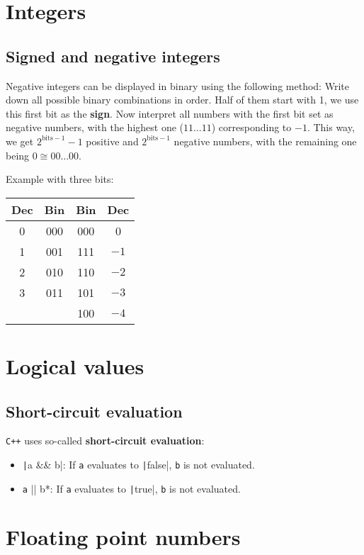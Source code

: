 \documentclass[fontsize=9pt, paper=landscape]{scrartcl}
\begin{document}
\begin{multicols}{2}
\section{Integers}

\subsection{Signed and negative integers}

Negative integers can be displayed in binary using the following method: Write down all possible binary combinations in order. Half of them start with 1, we use this first bit as the \textbf{sign}. Now interpret all numbers with the first bit set as negative numbers, with the highest one ($11\dots11$) corresponding to $-1$. This way, we get $2^{\text{bits}-1}-1$ positive and $2^{\text{bits}-1}$ negative numbers, with the remaining one being $0 \cong 00\dots00$.

Example with three bits:
\begin{tabular}{|c|c||c|c|}
	\hline
	Dec & Bin & Bin & Dec \\
	\hline
	0 & 000 & 000 & 0 \\
	1 & 001 & 111 & \( -1 \) \\
	2 & 010 & 110 & \( -2 \) \\
	3 & 011 & 101 & \( -3 \) \\
	  &     & 100 & \( -4 \) \\
	\hline
\end{tabular}

\section{Logical values}

\subsection{Short-circuit evaluation}

\texttt{C++} uses so-called \textbf{short-circuit evaluation}:
\begin{itemize}
	\item \texttt|a && b|: If \texttt{a} evaluates to \texttt|false|, \texttt{b} is not evaluated.
	\item \texttt*a || b*: If \texttt{a} evaluates to \texttt|true|, \texttt{b} is not evaluated.
\end{itemize}

\section{Floating point numbers}


\end{multicols}
\end{document}
